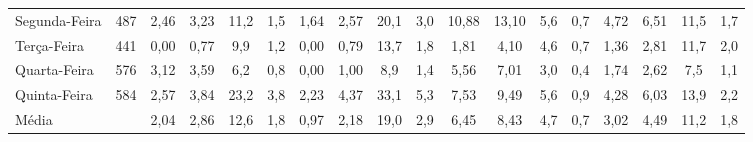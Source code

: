 \begin{landscape}
\begin{table}[H]
\begin{tabular}{llcccccccccccccccc}
Segunda-Feira        & \multicolumn{1}{l|}{487}                    & 2,46                 & 3,23                 & 11,2                       & \multicolumn{1}{c|}{1,5}   & 1,64                 & 2,57                       & 20,1                 & \multicolumn{1}{c|}{3,0}   & 10,88                & 13,10                      & 5,6                  & \multicolumn{1}{c|}{0,7}   & 4,72                 & 6,51                       & 11,5                 & 1,7                  \\
Terça-Feira          & \multicolumn{1}{l|}{441}                    & 0,00                 & 0,77                 & 9,9                        & \multicolumn{1}{c|}{1,2}   & 0,00                 & 0,79                       & 13,7                 & \multicolumn{1}{c|}{1,8}   & 1,81                 & 4,10                       & 4,6                  & \multicolumn{1}{c|}{0,7}   & 1,36                 & 2,81                       & 11,7                 & 2,0                  \\
Quarta-Feira         & \multicolumn{1}{l|}{576}                    & 3,12                 & 3,59                 & 6,2                        & \multicolumn{1}{c|}{0,8}   & 0,00                 & 1,00                       & 8,9                  & \multicolumn{1}{c|}{1,4}   & 5,56                 & 7,01                       & 3,0                  & \multicolumn{1}{c|}{0,4}   & 1,74                 & 2,62                       & 7,5                  & 1,1                  \\
Quinta-Feira         & \multicolumn{1}{l|}{584}                    & 2,57                 & 3,84                 & 23,2                       & \multicolumn{1}{c|}{3,8}   & 2,23                 & 4,37                       & 33,1                 & \multicolumn{1}{c|}{5,3}   & 7,53                 & 9,49                       & 5,6                  & \multicolumn{1}{c|}{0,9}   & 4,28                 & 6,03                       & 13,9                 & 2,2                  \\ \hline
Média                & \multicolumn{1}{l|}{}                       & 2,04                 & 2,86                 & 12,6                       & \multicolumn{1}{c|}{1,8}   & 0,97                 & 2,18                       & 19,0                 & \multicolumn{1}{c|}{2,9}   & 6,45                 & 8,43                       & 4,7                  & \multicolumn{1}{c|}{0,7}   & 3,02                 & 4,49                       & 11,2                 & 1,8                 
\end{tabular}
\end{table}
\end{landscape}

